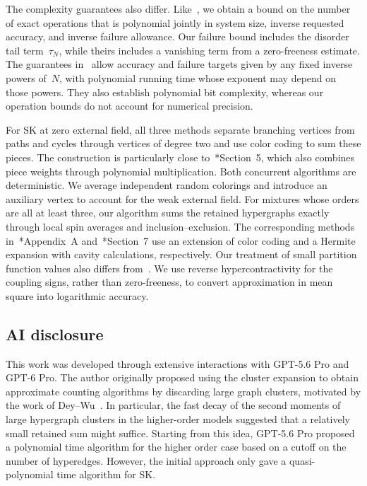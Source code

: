 \documentclass[letterpaper,11pt,reqno]{amsart}
\begin{document}
The complexity guarantees also differ. Like~\cite{HLMM26}, we obtain a bound on the number of exact operations that is polynomial jointly in system size, inverse requested accuracy, and inverse failure allowance. Our failure bound includes the disorder tail term~$\tau_N$, while theirs includes a vanishing term from a zero-freeness estimate. The guarantees in~\cite{SZ26} allow accuracy and failure targets given by any fixed inverse powers of~$N$, with polynomial running time whose exponent may depend on those powers. They also establish polynomial bit complexity, whereas our operation bounds do not account for numerical precision.

For SK at zero external field, all three methods separate branching vertices from paths and cycles through vertices of degree two and use color coding to sum these pieces. The construction is particularly close to~\cite{HLMM26}*{Section~5}, which also combines piece weights through polynomial multiplication. Both concurrent algorithms are deterministic. We average independent random colorings and introduce an auxiliary vertex to account for the weak external field. For mixtures whose orders are all at least three, our algorithm sums the retained hypergraphs exactly through local spin averages and inclusion--exclusion. The corresponding methods in~\cite{HLMM26}*{Appendix~A} and~\cite{SZ26}*{Section~7} use an extension of color coding and a Hermite expansion with cavity calculations, respectively. Our treatment of small partition function values also differs from~\cite{HLMM26}. We use reverse hypercontractivity for the coupling signs, rather than zero-freeness, to convert approximation in mean square into logarithmic accuracy.

\subsection{AI disclosure}\label{subsec:ai-disclosure}

This work was developed through extensive interactions with GPT-5.6 Pro and GPT-6 Pro. The author originally proposed using the cluster expansion to obtain approximate counting algorithms by discarding large graph clusters, motivated by the work of Dey--Wu~\cites{DW23,DW26}. In particular, the fast decay of the second moments of large hypergraph clusters in the higher-order models suggested that a relatively small retained sum might suffice. Starting from this idea, GPT-5.6 Pro proposed a polynomial time algorithm for the higher order case based on a cutoff on the number of hyperedges. However, the initial approach only gave a quasi-polynomial time algorithm for SK.
\end{document}
